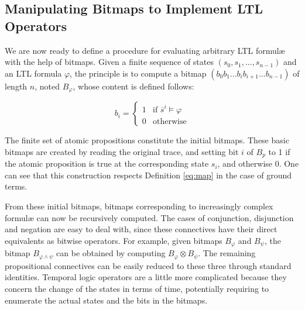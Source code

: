 \subsection{Manipulating Bitmaps to Implement LTL Operators} %

We are now ready to define a procedure for evaluating arbitrary LTL formul\ae{} with the help of bitmaps. Given a finite sequence of states $(s_0, s_1, ..., s_{n - 1})$ and an LTL formula $\varphi$, the principle is to compute a bitmap $(b_0b_1...b_ib_{i + 1}...b_{n - 1})$ of length $n$, noted $B_\varphi$, whose content is defined follows:

\begin{equation}\label{eq:map}
b_i = \begin{cases}
1 & \text{if $\overline{s}^i \models \varphi$} \\
0 & \text{otherwise}
\end{cases}
\end{equation}

The finite set of atomic propositions constitute the initial bitmaps. These basic bitmaps are created by reading the original trace, and setting bit $i$ of $B_p$ to 1 if the atomic proposition is true at the corresponding state $s_i$, and otherwise 0. One can see that this construction respects Definition \ref{eq:map} in the case of ground terms.

From these initial bitmaps, bitmaps corresponding to increasingly complex formul\ae{} can now be recursively computed. The cases of conjunction, disjunction and negation are easy to deal with, since these connectives have their direct equivalents as bitwise operators. For example, given bitmaps $B_\varphi$ and $B_\psi$, the bitmap $B_{\varphi \wedge \psi}$ can be obtained by computing $B_\varphi \otimes B_\psi$. The remaining propositional connectives can be easily reduced to these three through standard identities. %
% 
%
Temporal logic operators are a little more complicated because they concern the change of the states in terms of time, potentially requiring to enumerate the actual states and the bits in the bitmaps.

